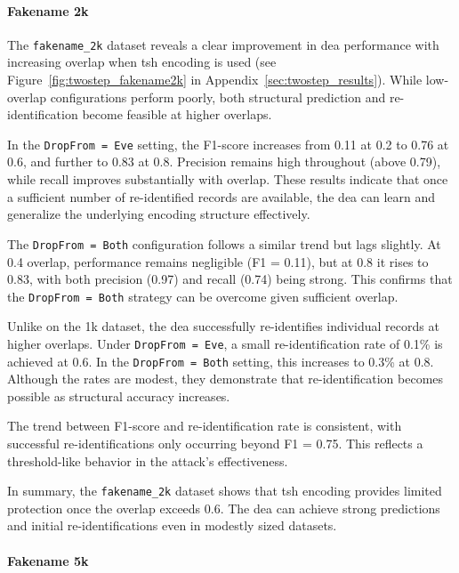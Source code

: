 \paragraph{Fakename 2k}

The \texttt{fakename\_2k} dataset reveals a clear improvement in \ac{dea} performance with increasing overlap when \ac{tsh} encoding is used (see Figure~\ref{fig:twostep_fakename2k} in Appendix~\ref{sec:twostep_results}).
While low-overlap configurations perform poorly, both structural prediction and re-identification become feasible at higher overlaps.

In the \texttt{DropFrom = Eve} setting, the F1-score increases from 0.11 at 0.2 to 0.76 at 0.6, and further to 0.83 at 0.8.
Precision remains high throughout (above 0.79), while recall improves substantially with overlap.
These results indicate that once a sufficient number of re-identified records are available, the \ac{dea} can learn and generalize the underlying encoding structure effectively.

The \texttt{DropFrom = Both} configuration follows a similar trend but lags slightly.
At 0.4 overlap, performance remains negligible (F1 = 0.11), but at 0.8 it rises to 0.83, with both precision (0.97) and recall (0.74) being strong.
This confirms that the \texttt{DropFrom = Both} strategy can be overcome given sufficient overlap.

Unlike on the 1k dataset, the \ac{dea} successfully re-identifies individual records at higher overlaps. Under \texttt{DropFrom = Eve}, a small re-identification rate of 0.1\% is achieved at 0.6.
In the \texttt{DropFrom = Both} setting, this increases to 0.3\% at 0.8.
Although the rates are modest, they demonstrate that re-identification becomes possible as structural accuracy increases.

The trend between F1-score and re-identification rate is consistent, with successful re-identifications only occurring beyond F1 = 0.75.
This reflects a threshold-like behavior in the attack's effectiveness.



In summary, the \texttt{fakename\_2k} dataset shows that \ac{tsh} encoding provides limited protection once the overlap exceeds 0.6.
The \ac{dea} can achieve strong predictions and initial re-identifications even in modestly sized datasets.


\paragraph{Fakename 5k}

